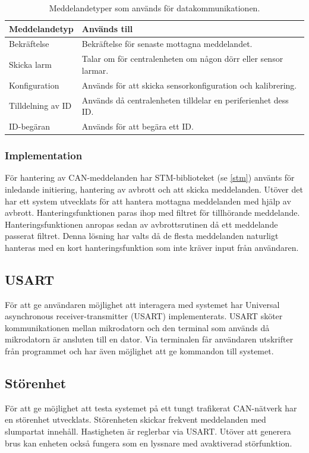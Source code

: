 \documentclass{article}
\begin{document}
\begin{table}[H]
	\centering
    \begin{tabular}{|p{}|p{}|}
		\hline
		Meddelandetyp & Används till \\ \hline \hline
		Bekräftelse		& Bekräftelse för senaste mottagna meddelandet. \\ \hline
		Skicka larm		& Talar om för centralenheten om någon dörr eller sensor larmar. \\ \hline
		Konfiguration		& Används för att skicka sensorkonfiguration och kalibrering. \\ \hline
		Tilldelning av ID		& Används då centralenheten tilldelar en periferienhet dess ID. \\ \hline
		ID-begäran		& Används för att begära ett ID. \\ \hline

	\end{tabular}
	\caption{Meddelandetyper som används för datakommunikationen.}
	\label{tab:meddelandetyper}
\end{table}


\subsubsection{Implementation}
För hantering av CAN-meddelanden har STM-biblioteket (se \ref{stm}) använts för inledande initiering,
hantering av avbrott och att skicka meddelanden.
Utöver det har ett system utvecklats för att hantera mottagna meddelanden med hjälp av avbrott.
Hanteringsfunktionen paras ihop med filtret för tillhörande meddelande.
Hanteringsfunktionen anropas sedan av avbrottsrutinen då ett meddelande passerat filtret.
Denna lösning har valts då de flesta meddelanden naturligt hanteras med en kort hanteringsfunktion
som inte kräver input från användaren.


\subsection{USART}
För att ge användaren möjlighet att interagera med systemet har Universal asynchronous receiver-transmitter (USART) implementerats. USART sköter kommunikationen mellan mikrodatorn och den terminal som används då mikrodatorn är ansluten till en dator. Via terminalen får användaren utskrifter från programmet och har även möjlighet att ge kommandon till systemet.


\subsection{Störenhet}
För att ge möjlighet att testa systemet på ett tungt trafikerat CAN-nätverk har en störenhet utvecklats. Störenheten skickar frekvent meddelanden med slumpartat innehåll. Hastigheten är reglerbar via USART. Utöver att generera brus kan enheten också fungera som en lyssnare med avaktiverad störfunktion.
\end{document}
